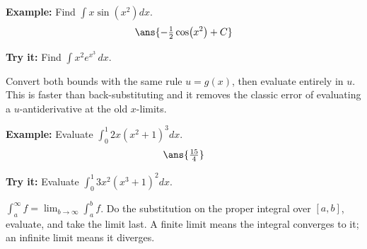 \documentclass[12pt]{article}
\begin{document}
\begin{examplebox}
\textbf{Example:} Find $\displaystyle\int x\sin\!\left(x^2\right)dx$.
\[ \ans{-\tfrac{1}{2}\cos\!\left(x^2\right) + C} \]
\end{examplebox}

\begin{tryitbox}
\textbf{Try it:} Find $\displaystyle\int x^2 e^{x^3}\,dx$.\\[2pt]
\end{tryitbox}


\begin{formulabox}
Convert both bounds with the same rule $u = g(x)$, then evaluate entirely in $u$.
This is faster than back-substituting and it removes the classic error of
evaluating a $u$-antiderivative at the old $x$-limits.
\end{formulabox}

\begin{examplebox}
\textbf{Example:} Evaluate $\displaystyle\int_{0}^{1} 2x\left(x^2+1\right)^3 dx$.
\[ \ans{\tfrac{15}{4}} \]
\end{examplebox}

\begin{tryitbox}
\textbf{Try it:} Evaluate $\displaystyle\int_{0}^{1} 3x^2\left(x^3+1\right)^2
dx$.\\[2pt]
\end{tryitbox}


\begin{formulabox}
$\int_{a}^{\infty} f = \lim_{b\to\infty}\int_{a}^{b} f$. Do the substitution on
the proper integral over $[a,b]$, evaluate, and take the limit last. A finite
limit means the integral converges to it; an infinite limit means it diverges.
\end{formulabox}
\end{document}
